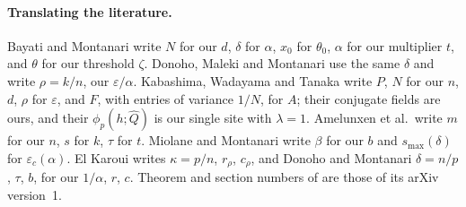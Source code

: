 \begin{refsection}
\paragraph{Translating the literature.} Bayati and Montanari write $N$ for our $d$, $\delta$ for $\alpha$, $x_0$ for $\theta_0$, $\alpha$ for our multiplier $t$, and $\theta$ for our threshold $\zeta$. Donoho, Maleki and Montanari use the same $\delta$ and write $\rho=k/n$, our $\varepsilon/\alpha$. Kabashima, Wadayama and Tanaka write $P$, $N$ for our $n$, $d$, $\rho$ for $\varepsilon$, and $F$, with entries of variance $1/N$, for $A$; their conjugate fields are ours, and their $\phi_p(h;\hat Q)$ is our single site with $\lambda=1$. Amelunxen et al.\ write $m$ for our $n$, $s$ for $k$, $\tau$ for $t$. Miolane and Montanari write $\beta$ for our $b$ and $s_{\max}(\delta)$ for $\varepsilon_c(\alpha)$. El Karoui writes $\kappa=p/n$, $r_\rho$, $c_\rho$, and Donoho and Montanari $\delta=n/p$, $\tau$, $b$, for our $1/\alpha$, $r$, $c$. Theorem and section numbers of \textcite{ThrampoulidisAbbasiHassibi2018} are those of its arXiv version~1.

\printchapterbib
\end{refsection}

